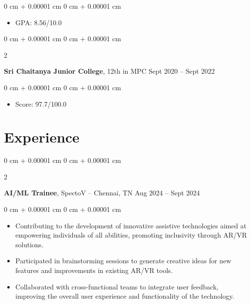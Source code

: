 \documentclass[10pt, letterpaper]{article}
\newenvironment{highlights}{
    \begin{itemize}[
        topsep=0.10 cm,
        parsep=0.10 cm,
        partopsep=0pt,
        itemsep=0pt,
        leftmargin=0 cm + 10pt
    ]
}{
    \end{itemize}
} %
\newenvironment{onecolentry}{
    \begin{adjustwidth}{
        0 cm + 0.00001 cm
    }{
        0 cm + 0.00001 cm
    }
}{
    \end{adjustwidth}
} %
\newenvironment{twocolentry}[2][]{
    \onecolentry
    \def\secondColumn{#2}
    \setcolumnwidth{\fill, 4.5 cm}
    \begin{paracol}{2}
}{
    \switchcolumn \raggedleft \secondColumn
    \end{paracol}
    \endonecolentry
} %
\begin{document}
        \vspace{0.10 cm}
        \begin{onecolentry}
            \begin{highlights}
                \item GPA: 8.56/10.0
            \end{highlights}
        \end{onecolentry}
        \begin{twocolentry}{
            Sept 2020 – Sept 2022
        }
            \textbf{Sri Chaitanya Junior College}, 12th in MPC\end{twocolentry}

        \vspace{0.10 cm}
        \begin{onecolentry}
            \begin{highlights}
                \item Score: 97.7/100.0
            \end{highlights}
        \end{onecolentry}
    \section{Experience}        
        \begin{twocolentry}{
            Aug 2024 – Sept 2024
        }
            \textbf{AI/ML Trainee}, SpectoV -- Chennai, TN\end{twocolentry}

        \vspace{0.10 cm}
        \begin{onecolentry}
            \begin{highlights}
                \item Contributing to the development of innovative assistive technologies aimed at empowering individuals of all abilities, promoting inclusivity through AR/VR solutions.
                \item Participated in brainstorming sessions to generate creative ideas for new features and improvements in existing AR/VR tools.
                \item Collaborated with cross-functional teams to integrate user feedback, improving the overall user experience and functionality of the technology.
            \end{highlights}
        \end{onecolentry}


        \vspace{0.2 cm}
\end{document}
